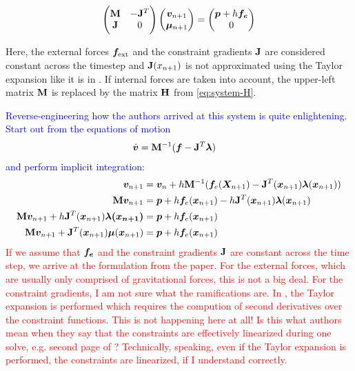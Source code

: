 \[
\begin{pmatrix}
    \mathbf{M} & -\mathbf{J}^T \\
    \mathbf{J} & 0
\end{pmatrix}
\begin{pmatrix}
    \bm{v}_{n+1} \\
    \bm{\mu}_{n+1}
\end{pmatrix}
=
\begin{pmatrix}
    \bm{p} + h\bm{f_e} \\
    0
\end{pmatrix}
\]

Here, the external forces $\bm{f}_{\text{ext}}$ and the constraint gradients $\mathbf{J}$ are considered constant across the timestep 
and $\mathbf{J}(x_{n+1})$ 
is not approximated using the Taylor expansion like it is in \cite{baraff1998}. If internal forces are taken into account, the upper-left 
matrix $\mathbf{M}$ is replaced by the matrix $\mathbf{H}$ from \autoref{eq:system-H}.

\textcolor{blue}{Reverse-engineering how the authors arrived at this system is quite enlightening. Start out from the equations of motion 
\cite{ascher1995}
    \begin{align*}
        \dot{\bm{v}} &= \mathbf{M}^{-1}(\bm{f} - \mathbf{J}^T \bm{\lambda})
    \end{align*}
    and perform implicit integration:
    \begin{align*}
        \bm{v}_{n+1} &= \bm{v}_n + h\mathbf{M}^{-1}(\bm{f}_e(\bm{X}_{n+1}) - \mathbf{J}^T(\bm{x}_{n+1}) \bm{\lambda}(\bm{x}_{n+1})) \\
        \mathbf{M}\bm{v}_{n+1} &= \bm{p} + h\bm{f}_e(\bm{x}_{n+1}) - h\mathbf{J}^T(\bm{x}_{n+1})\bm{\lambda}(\bm{x}_{n+1}) \\
        \mathbf{M}\bm{v}_{n+1} + h \mathbf{J}^T(\bm{x}_{n+1})\bm{\lambda(\bm{x}_{n+1})} &= \bm{p} + h\bm{f}_e(\bm{x}_{n+1}) \\
        \mathbf{M}\bm{v}_{n+1} + \mathbf{J}^T(\bm{x}_{n+1}) \bm{\mu}(\bm{x}_{n+1}) &= \bm{p} + h\bm{f}_e(\bm{x}_{n+1})
    \end{align*}
}
\textcolor{red}{If we assume that $\bm{f_e}$ and the constraint gradients $\mathbf{J}$ are constant across the time step, we arrive at the 
formulation from the paper. For the external forces, which are usually only comprised of gravitational forces, this is not a big 
deal. For the constraint gradients, I am not sure what the ramifications are. In \cite{baraff1998}, the Taylor expansion is performed
which requires the compution of second derivatives over the constraint functions. This is not happening here at all! Is this what 
authors mean when they say that the constraints are effectively linearized during one solve, e.g. second page 
of \cite{mueller2020}? Technically, speaking, even if the Taylor expansion is performed, the constraints are linearized, if I 
understand correctly.}

